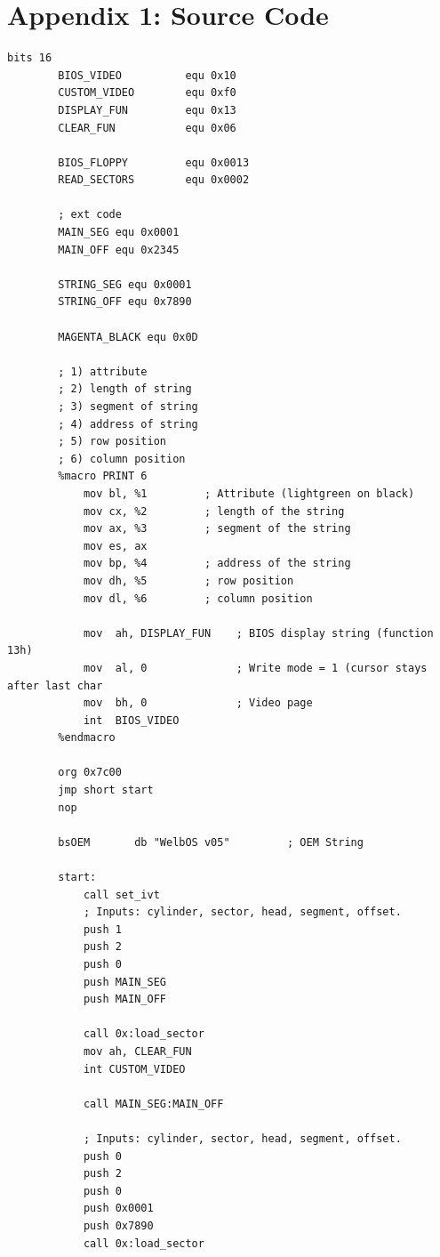 \documentclass{article}
\begin{document}
    \section{Appendix 1: Source Code}\label{sec:appendix_1}
    \begin{lstlisting}[caption={os623V05.asm listing}, captionpos=t]
        bits 16
        BIOS_VIDEO          equ 0x10
        CUSTOM_VIDEO        equ 0xf0
        DISPLAY_FUN         equ 0x13
        CLEAR_FUN           equ 0x06

        BIOS_FLOPPY         equ 0x0013
        READ_SECTORS        equ 0x0002

        ; ext code
        MAIN_SEG equ 0x0001
        MAIN_OFF equ 0x2345

        STRING_SEG equ 0x0001
        STRING_OFF equ 0x7890

        MAGENTA_BLACK equ 0x0D

        ; 1) attribute
        ; 2) length of string
        ; 3) segment of string
        ; 4) address of string
        ; 5) row position
        ; 6) column position
        %macro PRINT 6
            mov bl, %1         ; Attribute (lightgreen on black)
            mov cx, %2         ; length of the string
            mov ax, %3         ; segment of the string
            mov es, ax
            mov bp, %4         ; address of the string
            mov dh, %5         ; row position
            mov dl, %6         ; column position

            mov  ah, DISPLAY_FUN    ; BIOS display string (function 13h)
            mov  al, 0              ; Write mode = 1 (cursor stays after last char
            mov  bh, 0              ; Video page
            int  BIOS_VIDEO
        %endmacro

        org 0x7c00
        jmp short start
        nop

        bsOEM       db "WelbOS v05"         ; OEM String

        start:
            call set_ivt
            ; Inputs: cylinder, sector, head, segment, offset.
            push 1
            push 2
            push 0
            push MAIN_SEG
            push MAIN_OFF

            call 0x:load_sector
            mov ah, CLEAR_FUN
            int CUSTOM_VIDEO

            call MAIN_SEG:MAIN_OFF

            ; Inputs: cylinder, sector, head, segment, offset.
            push 0
            push 2
            push 0
            push 0x0001
            push 0x7890
            call 0x:load_sector


\end{lstlisting}
\end{document}
